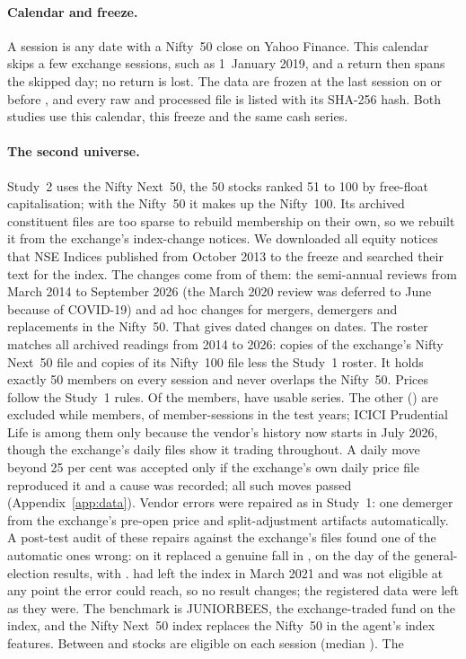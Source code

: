\documentclass[11pt]{article}
\begin{document}
\paragraph{Calendar and freeze.} A session is any date with a Nifty~50 close on Yahoo Finance. This calendar skips a few exchange sessions, such as 1~January 2019, and a return then spans the skipped day; no return is lost. The data are frozen at the last session on or before \FreezeDate{}, and every raw and processed file is listed with its SHA-256 hash. Both studies use this calendar, this freeze and the same cash series.

\paragraph{The second universe.} Study~2 uses the Nifty Next~50, the 50 stocks ranked 51 to 100 by free-float capitalisation; with the Nifty~50 it makes up the Nifty~100. Its archived constituent files are too sparse to rebuild membership on their own, so we rebuilt it from the exchange's index-change notices. We downloaded all \NxNotices{} equity notices that NSE Indices published from October 2013 to the freeze and searched their text for the index. The changes come from \NxNoticesUsed{} of them: the \NxReviews{} semi-annual reviews from March 2014 to September 2026 (the March 2020 review was deferred to June because of COVID-19) and \NxAdHoc{} ad hoc changes for mergers, demergers and replacements in the Nifty~50. That gives \NxChanges{} dated changes on \NxChangeDates{} dates. The roster matches all \NxReadings{} archived readings from 2014 to 2026: \NxReadingsNext{} copies of the exchange's Nifty Next~50 file and \NxReadingsHundred{} copies of its Nifty~100 file less the Study~1 roster. It holds exactly 50 members on every session and never overlaps the Nifty~50. Prices follow the Study~1 rules. Of the \NxSymbols{} members, \NxPriced{} have usable series. The other \NxExcluded{} (\NxExcludedList) are excluded while members, \NxExclShare{} of member-sessions in the test years; ICICI Prudential Life is among them only because the vendor's history now starts in July 2026, though the exchange's daily files show it trading throughout. A daily move beyond 25 per cent was accepted only if the exchange's own daily price file reproduced it and a cause was recorded; all \NxJumps{} such moves passed (Appendix~\ref{app:data}). Vendor errors were repaired as in Study~1: one demerger from the exchange's pre-open price and \NxSplitRepairs{} split-adjustment artifacts automatically. A post-test audit of these repairs against the exchange's files found one of the automatic ones wrong: on \NxBadRepairDate{} it replaced a genuine \NxBadRepairNSE{} fall in \NxBadRepairSym{}, on the day of the general-election results, with \NxBadRepairRep{}. \NxBadRepairSym{} had left the index in March 2021 and was not eligible at any point the error could reach, so no result changes; the registered data were left as they were. The benchmark is JUNIORBEES, the exchange-traded fund on the index, and the Nifty Next~50 index replaces the Nifty~50 in the agent's index features. Between \NxEligMin{} and \NxEligMax{} stocks are eligible on each session (median \NxEligMed{}). The 
\end{document}
